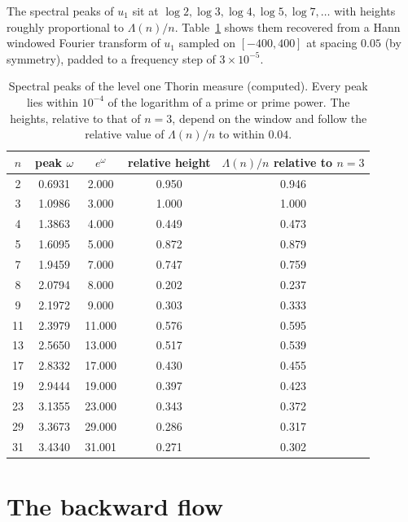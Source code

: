 The spectral peaks of $u_1$ sit at $\log2,\log3,\log4,\log5,\log7,\dots$ with heights roughly proportional to $\Lambda(n)/n$. Table~\ref{lo:tab:spectrum} shows them recovered from a Hann windowed Fourier transform of $u_1$ sampled on $[-400,400]$ at spacing $0.05$ (by symmetry), padded to a frequency step of $3\times10^{-5}$.

\begin{table}[ht]
\centering
\small
\begin{tabular}{ccccc}
\toprule
$n$ & peak $\omega$ & $e^{\omega}$ & relative height & $\Lambda(n)/n$ relative to $n=3$\\
\midrule
2 & 0.6931 & 2.000 & 0.950 & 0.946\\
3 & 1.0986 & 3.000 & 1.000 & 1.000\\
4 & 1.3863 & 4.000 & 0.449 & 0.473\\
5 & 1.6095 & 5.000 & 0.872 & 0.879\\
7 & 1.9459 & 7.000 & 0.747 & 0.759\\
8 & 2.0794 & 8.000 & 0.202 & 0.237\\
9 & 2.1972 & 9.000 & 0.303 & 0.333\\
11 & 2.3979 & 11.000 & 0.576 & 0.595\\
13 & 2.5650 & 13.000 & 0.517 & 0.539\\
17 & 2.8332 & 17.000 & 0.430 & 0.455\\
19 & 2.9444 & 19.000 & 0.397 & 0.423\\
23 & 3.1355 & 23.000 & 0.343 & 0.372\\
29 & 3.3673 & 29.000 & 0.286 & 0.317\\
31 & 3.4340 & 31.001 & 0.271 & 0.302\\
\bottomrule
\end{tabular}
\caption{Spectral peaks of the level one Thorin measure (computed). Every peak lies within $10^{-4}$ of the logarithm of a prime or prime power. The heights, relative to that of $n=3$, depend on the window and follow the relative value of $\Lambda(n)/n$ to within $0.04$.}\label{lo:tab:spectrum}
\end{table}

\section{The backward flow}\label{lo:sec:backward}


